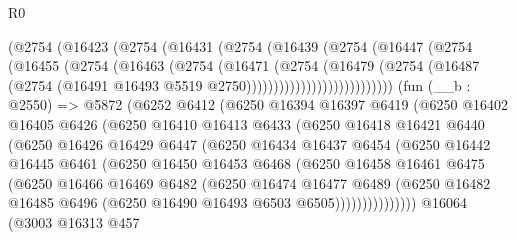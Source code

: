 \begin{lexlean}{R0}
\begin{coremodule}
                  (@2754
                    (@16423
                      (@2754
                        (@16431
                          (@2754
                            (@16439
                              (@2754
                                (@16447
                                  (@2754
                                    (@16455
                                      (@2754
                                        (@16463
                                          (@2754
                                            (@16471
                                              (@2754
                                                (@16479
                                                  (@2754
                                                    (@16487
                                                      (@2754
                                                        (@16491
                                                          @16493
                                                          @5519
                                                          @2750)))))))))))))))))))))))))))
    (fun (__b : @2550) =>
    @5872
      (@6252
        @6412
        (@6250
          @16394
          @16397
          @6419
          (@6250
            @16402
            @16405
            @6426
            (@6250
              @16410
              @16413
              @6433
              (@6250
                @16418
                @16421
                @6440
                (@6250
                  @16426
                  @16429
                  @6447
                  (@6250
                    @16434
                    @16437
                    @6454
                    (@6250
                      @16442
                      @16445
                      @6461
                      (@6250
                        @16450
                        @16453
                        @6468
                        (@6250
                          @16458
                          @16461
                          @6475
                          (@6250
                            @16466
                            @16469
                            @6482
                            (@6250
                              @16474
                              @16477
                              @6489
                              (@6250
                                @16482
                                @16485
                                @6496
                                (@6250 @16490 @16493 @6503 @6505)))))))))))))))
    @16064
    (@3003
      @16313
      @457

\end{coremodule}
\end{lexlean}
